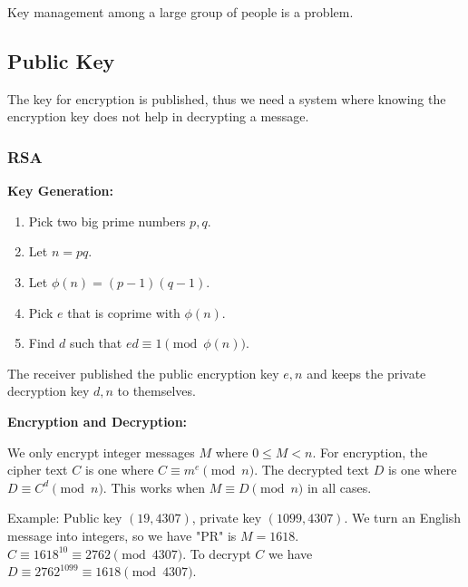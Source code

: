 \documentclass[12pt]{article}
\begin{document}
Key management among a large group of people is a problem.

\subsection*{Public Key}
The key for encryption is published, thus we need a system where knowing the encryption key does not help in decrypting a message.

\subsubsection*{RSA}
{\bf Key Generation:}
\begin{enumerate}
\item Pick two big prime numbers $p, q$.
\item Let $n = pq$.
\item Let $\phi(n) = (p-1)(q-1)$.
\item Pick $e$ that is coprime with $\phi(n)$.
\item Find $d$ such that $ed \equiv 1 \pmod{\phi(n)}$.
\end{enumerate}

The receiver published the public encryption key $e, n$ and keeps the private decryption key $d, n$ to themselves.

{\bf Encryption and Decryption:}

We only encrypt integer messages $M$ where $0 \leq M < n$. For encryption, the cipher text $C$ is one where $C \equiv m^e \pmod{n}$. The decrypted text $D$ is one where $D \equiv C^d \pmod{n}$. This works when $M \equiv D \pmod n$ in all cases.

Example: Public key $(19, 4307)$, private key $(1099, 4307)$. We turn an English message into integers, so we have "PR" is $M = 1618$. $C \equiv 1618^{10} \equiv 2762 \pmod{4307}$. To decrypt $C$ we have $D \equiv 2762^{1099} \equiv 1618 \pmod{4307}$.


\end{document}
